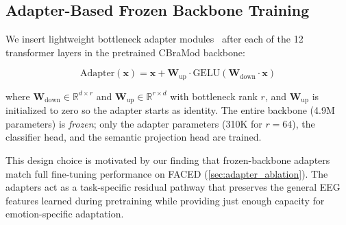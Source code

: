 \subsection{Adapter-Based Frozen Backbone Training}
\label{sec:adapters}
\vspace{-1mm}

We insert lightweight bottleneck adapter modules~\cite{houlsby2019adapters} after each of the 12 transformer layers in the pretrained CBraMod backbone:

\begin{equation}
    \text{Adapter}(\mathbf{x}) = \mathbf{x} + \mathbf{W}_{\text{up}} \cdot \text{GELU}(\mathbf{W}_{\text{down}} \cdot \mathbf{x})
\end{equation}

where $\mathbf{W}_{\text{down}} \in \mathbb{R}^{d \times r}$ and $\mathbf{W}_{\text{up}} \in \mathbb{R}^{r \times d}$ with bottleneck rank $r$, and $\mathbf{W}_{\text{up}}$ is initialized to zero so the adapter starts as identity. The entire backbone (4.9M parameters) is \emph{frozen}; only the adapter parameters (310K for $r = 64$), the classifier head, and the semantic projection head are trained.

This design choice is motivated by our finding that frozen-backbone adapters match full fine-tuning performance on FACED (\cref{sec:adapter_ablation}). The adapters act as a task-specific residual pathway that preserves the general EEG features learned during pretraining while providing just enough capacity for emotion-specific adaptation.
